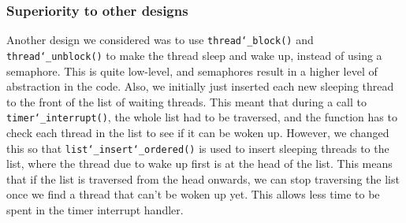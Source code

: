 \documentclass{article}
\renewcommand{\_}{\char`_}
\begin{document}
\subsubsection{Superiority to other designs}

Another design we considered was to use \texttt{thread\_block()} and \texttt{thread\_unblock()} to make the thread sleep and wake up, instead of using a semaphore. This is quite low-level, and semaphores result in a higher level of abstraction in the code. Also, we initially just inserted each new sleeping thread to the front of the list of waiting threads. This meant that during a call to \texttt{timer\_interrupt()}, the whole list had to be traversed, and the function has to check each thread in the list to see if it can be woken up. However, we changed this so that \texttt{list\_insert\_ordered()} is used to insert sleeping threads to the list, where the thread due to wake up first is at the head of the list. This means that if the list is traversed from the head onwards, we can stop traversing the list once we find a thread that can't be woken up yet. This allows less time to be spent in the timer interrupt handler.


\end{document}
